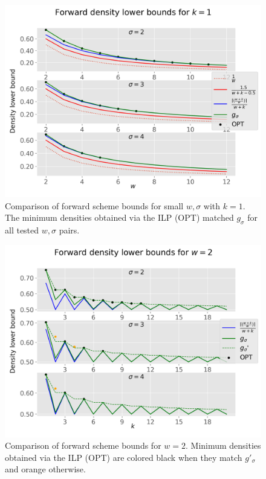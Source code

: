 \documentclass{article}
\begin{document}
\begin{figure}[ht]
\includegraphics[width=\textwidth]{media/bound-fwd-k1.png}
\caption{Comparison of forward scheme bounds for small $w, \sigma$ with $k=1$. The minimum densities obtained via the ILP (OPT) matched $g_\sigma$ for all tested $w, \sigma$ pairs.}
\label{fig:fwd-bound-k1}
\end{figure}

\begin{figure}[ht]
\includegraphics[width=\textwidth]{media/bound-fwd-w2.png}
\caption{Comparison of forward scheme bounds for $w=2$. Minimum densities obtained via the ILP (OPT) are colored black when they match $g'_\sigma$ and orange otherwise.}
\label{fig:fwd-bound-w2}
\end{figure}
\end{document}
